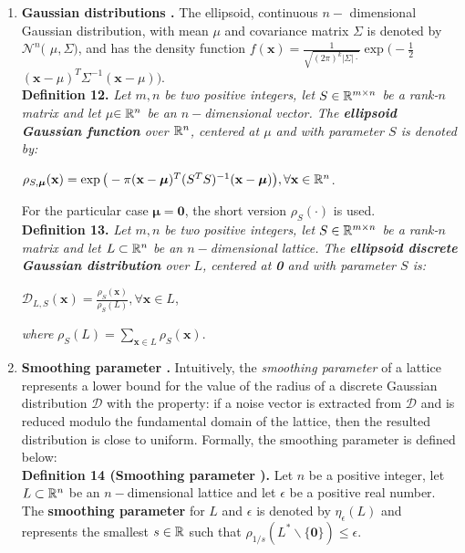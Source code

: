 \begin{enumerate}
	\item \textbf{Gaussian distributions \cite{AGH+12}.} The ellipsoid, continuous $n-$ dimensional Gaussian distribution, with mean {\boldmath$\mu$} and covariance matrix {\boldmath$\Sigma$} is denoted by $\mathcal{N}^n($ {\boldmath$\mu, \Sigma)$}, and has the density function $f(\textbf{x}) = \frac{1}{\sqrt{(2\pi)^k |\Sigma|\cdot}} \exp \big( -\frac{1}{2}$ {\boldmath$(\textbf{x} - \mu)^T \Sigma ^{-1} (\textbf{x} - \mu)$}$\big)$.\\
	
	\textbf{Definition 12.} \textit{ Let $m,n$ be two positive integers, let $S \in \mathbb{R}^{m\times n}$ be a rank-$n$ matrix and let {\boldmath$\mu$}$\in\mathbb{R}^n$ be an $n-$dimensional vector. The \textbf{ellipsoid Gaussian function} over $\mathbb{R}^n$, centered at {\boldmath$\mu$} and with parameter $S$ is denoted by:}
	\begin{center}
		$\rho_{S, \bm{\mu}}(\textbf{x}) = \exp \big(-\pi (\textbf{x} - \bm{\mu})^T(S^TS)^{-1}(\textbf{x} - \bm{\mu}) \big), \forall \textbf{x}\in \mathbb{R}^n$.
	\end{center}

	For the particular case $\bm{\mu} = \textbf{0}$, the short version $\rho_S(\cdot)$ is used.\\
	
	\textbf{Definition 13.} \textit{Let $m,n$ be two positive integers, let $S \in \mathbb{R}^{m\times n}$ be a rank-$n$ matrix and let $L \subset \mathbb{R}^n$ be an $n-$dimensional lattice. The \textbf{ellipsoid discrete Gaussian distribution} over $L$, centered at \textbf{0} and with parameter $S$ is:} 
	\begin{center}
		$\mathcal{D}_{L,S}(\textbf{x}) = \frac{\rho_S(\textbf{x})}{\rho_S(L)}, \forall \textbf{x} \in L$,
	\end{center}
\textit{where} $\rho_S(L) = \displaystyle{\sum_{\textbf{x}\in L} \rho_S(\textbf{x})}$.
	
	\item \textbf{Smoothing parameter \cite{MiR04}.} Intuitively, the \textit{smoothing parameter} of a lattice represents a lower bound for the value of the radius of a discrete Gaussian distribution $\mathcal{D}$ with the property: if a noise vector is extracted from $\mathcal{D}$ and is reduced modulo the fundamental domain of the lattice, then the resulted distribution is close to uniform. Formally, the smoothing parameter is defined below:\\
	
	\textbf{Definition 14 (Smoothing parameter \cite{MiR04}).} Let $n$ be a positive integer,  let $L \subset \mathbb{R}^n$ be an $n-$dimensional lattice and let $\epsilon$ be a positive real number. The \textbf{smoothing parameter} for $L$ and $\epsilon$ is denoted by $\eta_\epsilon(L)$ and represents the smallest $s \in \mathbb{R}$ such that $\rho_{1/s}(L^* \backslash \{\textbf{0}\}) \leq \epsilon$.


\end{enumerate}
